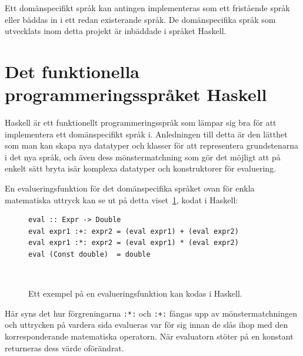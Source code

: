 \begin{draft}
Ett domänspecifikt språk kan antingen implementeras som ett fristående språk eller bäddas in i ett redan existerande språk. De domänspecifika språk som utvecklats inom detta projekt är inbäddade i språket Haskell.
\end{draft}

\section{Det funktionella programmeringsspråket Haskell}

\begin{draft}
  Haskell är ett funktionellt programmeringsspråk som lämpar sig bra för att
  implementera ett domänspecifikt språk i. Anledningen till detta är den lätthet
  som man kan skapa nya datatyper och klasser för att representera grundstenarna
  i det nya språk, och även dess mönstermatchning som gör det möjligt att på
  enkelt sätt bryta isär komplexa datatyper och konstruktorer för evaluering.

  En evalueringsfunktion för det domänspecifika språket ovan för enkla
  matematiska uttryck kan se ut på detta viset~\ref{fig:eval_exempel}, kodat i
  Haskell:

  \begin{figure}[tph]
  \begin{lstlisting}
eval :: Expr -> Double
eval expr1 :+: expr2 = (eval expr1) + (eval expr2)
eval expr1 :*: expr2 = (eval expr1) * (eval expr2)
eval (Const double)  = double
  \end{lstlisting}
  \caption{Ett exempel på en evalueringsfunktion kan kodas i
Haskell.}~\label{fig:eval_exempel} \end{figure}

Här syns det hur förgreningarna \texttt{:*:} och \texttt{:+:} fångas upp av
mönstermatchningen och uttrycken på vardera sida evalueras var för sig innan de
slås ihop med den korresponderande matematiska operatorn. När evaluatorn stöter
på en konstant returneras dess värde oförändrat. 

\end{draft}


